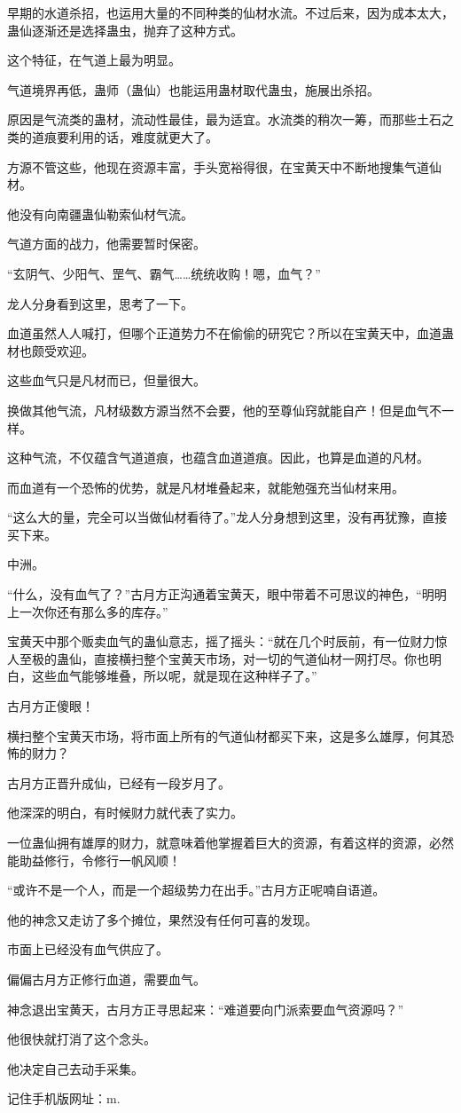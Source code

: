 \begin{this_body}
早期的水道杀招，也运用大量的不同种类的仙材水流。不过后来，因为成本太大，蛊仙逐渐还是选择蛊虫，抛弃了这种方式。

这个特征，在气道上最为明显。

气道境界再低，蛊师（蛊仙）也能运用蛊材取代蛊虫，施展出杀招。

原因是气流类的蛊材，流动性最佳，最为适宜。水流类的稍次一筹，而那些土石之类的道痕要利用的话，难度就更大了。

方源不管这些，他现在资源丰富，手头宽裕得很，在宝黄天中不断地搜集气道仙材。

他没有向南疆蛊仙勒索仙材气流。

气道方面的战力，他需要暂时保密。

“玄阴气、少阳气、罡气、霸气……统统收购！嗯，血气？”

龙人分身看到这里，思考了一下。

血道虽然人人喊打，但哪个正道势力不在偷偷的研究它？所以在宝黄天中，血道蛊材也颇受欢迎。

这些血气只是凡材而已，但量很大。

换做其他气流，凡材级数方源当然不会要，他的至尊仙窍就能自产！但是血气不一样。

这种气流，不仅蕴含气道道痕，也蕴含血道道痕。因此，也算是血道的凡材。

而血道有一个恐怖的优势，就是凡材堆叠起来，就能勉强充当仙材来用。

“这么大的量，完全可以当做仙材看待了。”龙人分身想到这里，没有再犹豫，直接买下来。

中洲。

“什么，没有血气了？”古月方正沟通着宝黄天，眼中带着不可思议的神色，“明明上一次你还有那么多的库存。”

宝黄天中那个贩卖血气的蛊仙意志，摇了摇头：“就在几个时辰前，有一位财力惊人至极的蛊仙，直接横扫整个宝黄天市场，对一切的气道仙材一网打尽。你也明白，这些血气能够堆叠，所以呢，就是现在这种样子了。”

古月方正傻眼！

横扫整个宝黄天市场，将市面上所有的气道仙材都买下来，这是多么雄厚，何其恐怖的财力？

古月方正晋升成仙，已经有一段岁月了。

他深深的明白，有时候财力就代表了实力。

一位蛊仙拥有雄厚的财力，就意味着他掌握着巨大的资源，有着这样的资源，必然能助益修行，令修行一帆风顺！

“或许不是一个人，而是一个超级势力在出手。”古月方正呢喃自语道。

他的神念又走访了多个摊位，果然没有任何可喜的发现。

市面上已经没有血气供应了。

偏偏古月方正修行血道，需要血气。

神念退出宝黄天，古月方正寻思起来：“难道要向门派索要血气资源吗？”

他很快就打消了这个念头。

他决定自己去动手采集。

记住手机版网址：m.

\end{this_body}

